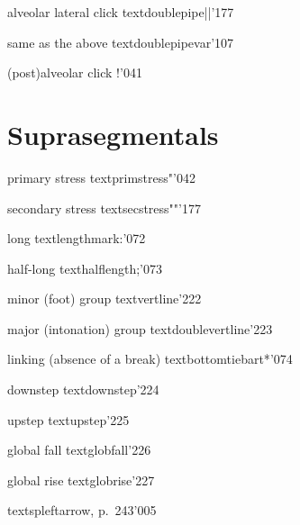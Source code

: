 %
  {alveolar lateral click}%
  {\tbs textdoublepipe}{||}{\ipanew}{'177}

%
  {same as the above}%
  {\tbs textdoublepipevar}{}{\PSG}{'107}

%
  {(post)alveolar click}%
  {!}{}{\ipanew}{'041}


\section{Suprasegmentals}

%
  {primary stress}%
  {\tbs textprimstress}{"}{\ipaall}{'042}

%
  {secondary stress}%
  {\tbs textsecstress}{""}{\ipaall}{'177}

%
  {long}%
  {\tbs textlengthmark}{:}{\ipaall}{'072}

%
  {half-long}%
  {\tbs texthalflength}{;}{\ipaall}{'073}

%
  {minor (foot) group}%
  {\tbs textvertline}{}{\ipanew}{'222}

%
  {major (intonation) group}%
  {\tbs textdoublevertline}{}{\ipanew}{'223}

%
  {linking (absence of a break)}%
  {\tbs textbottomtiebar}{\tbs t*\TT{}}{\ipanew}{'074}
  \label{bottomtiebar}

%
  {downstep}%
  {\tbs textdownstep}{}{\ipanew}{'224}%

%
  {upstep}%
  {\tbs textupstep}{}{\ipanew}{'225}

%
  {global fall}%
  {\tbs textglobfall}{}{\ipanew}{'226}

%
  {global rise}%
  {\tbs textglobrise}{}{\ipanew}{'227}

%
  {}%
  {\tbs textspleftarrow}{}{\PSG, p.~243}{'005}

